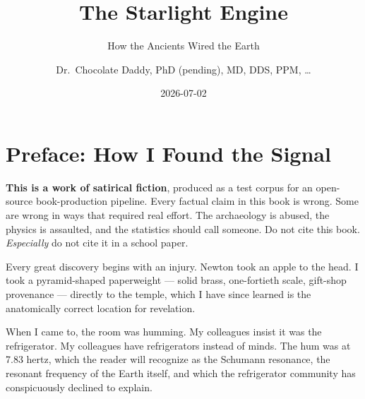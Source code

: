 \documentclass[
  english,
  11pt,
  letterpaper,
]{scrbook}
\title{The Starlight Engine}
\subtitle{How the Ancients Wired the Earth}
\author{Dr.~Chocolate Daddy, PhD (pending), MD, DDS, PPM, \ldots{}}
\date{2026-07-02}
\renewcommand*\contentsname{Table of contents}
\newcommand\contentsname{Table of contents}
\begin{document}
\frontmatter
\maketitle

\renewcommand*\contentsname{Table of contents}
{
\setcounter{tocdepth}{2}
\tableofcontents
}

\mainmatter
{}

\chapter*{Preface: How I Found the
Signal}\label{preface-how-i-found-the-signal}


\begin{tcolorbox}[enhanced jigsaw, arc=.35mm, bottomrule=.15mm, bottomtitle=1mm, breakable, colback=white, colbacktitle=quarto-callout-important-color!10!white, colframe=quarto-callout-important-color-frame, coltitle=black, left=2mm, leftrule=.75mm, opacityback=0, opacitybacktitle=0.6, rightrule=.15mm, title=\textcolor{quarto-callout-important-color}{\faExclamation}\hspace{0.5em}{Read this first (the publisher made me put this here)}, titlerule=0mm, toprule=.15mm, toptitle=1mm]

\textbf{This is a work of satirical fiction}, produced as a test corpus
for an open-source book-production pipeline. Every factual claim in this
book is wrong. Some are wrong in ways that required real effort. The
archaeology is abused, the physics is assaulted, and the statistics
should call someone. Do not cite this book. \emph{Especially} do not
cite it in a school paper.

\end{tcolorbox}

Every great discovery begins with an injury. Newton took an apple to the
head. I took a pyramid-shaped paperweight --- solid brass, one-fortieth
scale, gift-shop provenance --- directly to the temple, which I have
since learned is the anatomically correct location for revelation.

When I came to, the room was humming. My colleagues insist it was the
refrigerator. My colleagues have refrigerators instead of minds. The hum
was at 7.83 hertz, which the reader will
recognize as the Schumann resonance, the resonant frequency of the Earth
itself, and which the refrigerator community has conspicuously declined
to explain.
\end{document}
